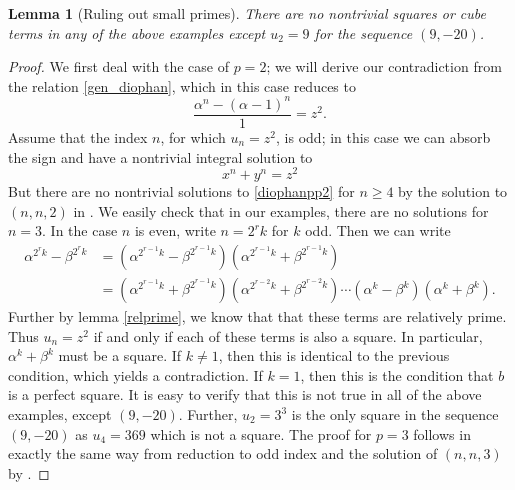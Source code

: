 \documentclass[12pt]{amsart}
\newtheorem{lem}[thm]{Lemma}
\theoremstyle{definition}
\begin{document}
\begin{lem}[Ruling out small primes]\label{smallp}
There are no nontrivial squares or cube terms in any of the above examples except $u_2 = 9$ for the sequence $(9,-20)$.
\end{lem}

\begin{proof}

We first deal with the case of $p=2$; we will derive our contradiction from the relation \eqref{gen_diophan}, which in this case reduces to
\begin{equation}\label{D1dio} \frac{\alpha^n - (\alpha-1)^n}{1} = z^2.\end{equation} 
Assume that the index $n$, for which $u_n = z^2$, is odd; in this case we can absorb the sign and have a nontrivial integral solution to
\begin{equation}\label{diophanpp2}
x^n +y^n = z^2
\end{equation}
But there are no nontrivial solutions to \eqref{diophanpp2} for $n \geq 4$ by the solution to $(n,n,2)$ in \cite{darmon97} .  We easily check that in our examples, there are no solutions for $n=3$.  In the case $n$ is even, write $n=2^rk$ for $k$ odd.  Then we can write
\begin{align*}
\alpha^{2^rk} - \beta^{2^rk} & = (\alpha^{2^{r-1}k} - \beta^{2^{r-1}k})(\alpha^{2^{r-1}k} + \beta^{2^{r-1}k}) \\
& = (\alpha^{2^{r-1}k} + \beta^{2^{r-1}k})(\alpha^{2^{r-2}k} + \beta^{2^{r-2}k}) \cdots (\alpha^{k} - \beta^{k}) (\alpha^{k} + \beta^{k}). 
\end{align*}
Further by lemma \ref{relprime}, we know that that these terms are relatively prime.  Thus $u_n=z^2$ if and only if each of these terms is also a square.  In particular, $\alpha^k + \beta^k$ must be a square.  If $k \neq 1$, then this is identical to the previous condition, which yields a contradiction.  If $k = 1$, then this is the condition that $b$ is a perfect square.  It is easy to verify that this is not true in all of the above examples, except $(9,-20)$.  Further, $u_2 = 3^3$ is the only square in the sequence $(9,-20)$ as $u_4 = 369$ which is not a square.  The proof for $p=3$ follows in exactly the same way from reduction to odd index and the solution of $(n,n,3)$ by \cite{darmon97}.

\end{proof}
\end{document}
